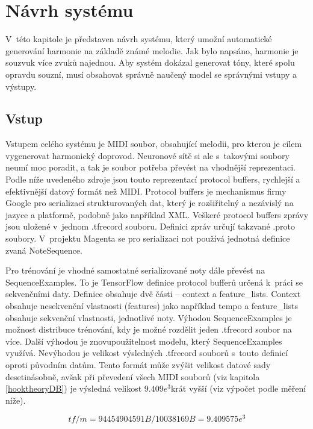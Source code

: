 \chapter{Návrh systému}
\label{navrhSystemu}
V~této kapitole je představen návrh systému,
který umožní automatické generování harmonie na základě známé melodie.
Jak bylo napsáno, harmonie je souzvuk více zvuků najednou.
Aby systém dokázal generovat tóny, které spolu opravdu souzní,
musí obsahovat správně naučený model se správnými vstupy a výstupy.

\section{Vstup}
Vstupem celého systému je MIDI soubor, obsahující melodii,
pro kterou je cílem vygenerovat harmonický doprovod.
Neuronové sítě si ale s~takovými soubory neumí moc poradit,
a tak je soubor potřeba převést na vhodnější reprezentaci.
Podle níže uvedeného zdroje \cite{google_git_polyphony} jsou touto reprezentací protocol buffers,
rychlejší a efektivnější datový formát než MIDI.
Protocol buffers je mechanismus firmy Google pro serializaci strukturovaných dat,
který je rozšiřitelný a nezávislý na jazyce a platformě, podobně jako například XML.
Veškeré protocol buffers zprávy jsou uložené v~jednom .tfrecord souboru.
Definici zpráv určují takzvané .proto soubory.\cite{google_ProtocolBuffers}
V~projektu Magenta se pro serializaci not používá jednotná definice zvaná NoteSequence.
\cite{google_musicColab}
\par

Pro trénování je vhodné samostatné serializované noty dále převést na SequenceExamples.
\cite{google_git_polyphony}
To je TensorFlow definice protocol bufferů určená k~práci se sekvenčními daty.
Definice obsahuje dvě části -- context a feature\_lists.
Context obsahuje nesekvenční vlastnosti (features) jako například tempo a 
feature\_lists obsahuje sekvenční vlastnosti, jednotlivé noty.
Výhodou SequenceExamples je možnost distribuce trénování, 
kdy je možné rozdělit jeden .tfrecord soubor na více.
Další výhodou je znovupoužitelnost modelu, který SequenceExamples využívá.
Nevýhodou je velikost výsledných .tfrecord souborů s~touto definicí oproti původním datům. 
\cite{britz_undocumentedFeatures}
Tento formát může zvýšit velikost datové sady desetinásobně,
avšak při převedení všech MIDI souborů (viz kapitola \ref{hooktheoryDB}) 
je výsledná velikost $9.409e^3$krát vyšší (viz výpočet podle měření níže).

$$ tf / m = 94454904591B / 10038169B = 9.409575e^3$$

